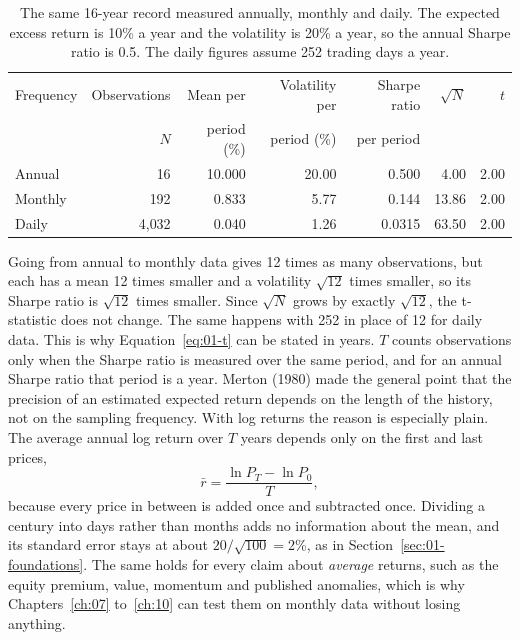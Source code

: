 \begin{table}[htbp]
\centering
\small
\caption{The same 16-year record measured annually, monthly and daily. The expected excess return is 10\% a year and the volatility is 20\% a year, so the annual Sharpe ratio is 0.5. The daily figures assume 252 trading days a year.}
\label{tab:01-frequency}
\begin{tabular}{@{}lrrrrrr@{}}
\toprule
Frequency & Observations & Mean per & Volatility per & Sharpe ratio & $\sqrt{N}$ & $t$ \\
 & $N$ & period (\%) & period (\%) & per period & & \\
\midrule
Annual  & 16    & 10.000 & 20.00 & 0.500  & 4.00  & 2.00 \\
Monthly & 192   & 0.833  & 5.77  & 0.144  & 13.86 & 2.00 \\
Daily   & 4{,}032 & 0.040 & 1.26  & 0.0315 & 63.50 & 2.00 \\
\bottomrule
\end{tabular}
\end{table}

Going from annual to monthly data gives 12 times as many observations, but each has a mean 12 times smaller and a volatility $\sqrt{12}$ times smaller, so its Sharpe ratio is $\sqrt{12}$ times smaller. Since $\sqrt{N}$ grows by exactly $\sqrt{12}$, the t-statistic does not change. The same happens with 252 in place of 12 for daily data. This is why Equation~\eqref{eq:01-t} can be stated in years. $T$ counts observations only when the Sharpe ratio is measured over the same period, and for an annual Sharpe ratio that period is a year. Merton (1980) made the general point that the precision of an estimated expected return depends on the length of the history, not on the sampling frequency. With log returns the reason is especially plain. The average annual log return over $T$ years depends only on the first and last prices,
\begin{equation}
  \bar{r} = \frac{\ln P_T - \ln P_0}{T}, \nonumber
\end{equation}
because every price in between is added once and subtracted once. Dividing a century into days rather than months adds no information about the mean, and its standard error stays at about $20/\sqrt{100} = 2$\%, as in Section~\ref{sec:01-foundations}. The same holds for every claim about \emph{average} returns, such as the equity premium, value, momentum and published anomalies, which is why Chapters~\ref{ch:07} to~\ref{ch:10} can test them on monthly data without losing anything.

